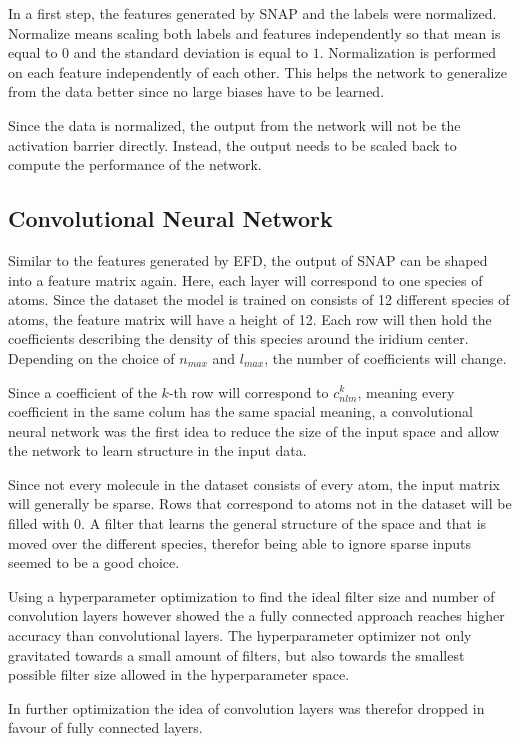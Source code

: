 In a first step, the features generated by SNAP and the labels were normalized.
Normalize means scaling both labels and features independently so that mean is equal to $0$ and the standard deviation is equal to $1$.
Normalization is performed on each feature independently of each other.
This helps the network to generalize from the data better since no large biases have to be learned.

Since the data is normalized, the output from the network will not be the activation barrier directly.
Instead, the output needs to be scaled back to compute the performance of the network.

\subsection{Convolutional Neural Network}

Similar to the features generated by EFD, the output of SNAP can be shaped into a feature matrix again.
Here, each layer will correspond to one species of atoms.
Since the dataset the model is trained on consists of 12 different species of atoms, the feature matrix will have a height of 12.
Each row will then hold the coefficients describing the density of this species around the iridium center.
Depending on the choice of $n_{max}$ and $l_{max}$, the number of coefficients will change.

Since a coefficient of the $k$-th row will correspond to $c^k_{nlm}$, meaning every coefficient in the same colum has the same spacial meaning,
a convolutional neural network was the first idea to reduce the size of the input space and allow the network to learn structure in the input data.

Since not every molecule in the dataset consists of every atom, the input matrix will generally be sparse.
Rows that correspond to atoms not in the dataset will be filled with 0.
A filter that learns the general structure of the space and that is moved over the different species, therefor 
being able to ignore sparse inputs seemed to be a good choice.

Using a hyperparameter optimization to find the ideal filter size and number of convolution layers however showed
the a fully connected approach reaches higher accuracy than convolutional layers.
The hyperparameter optimizer not only gravitated towards a small amount of filters, but also towards 
the smallest possible filter size allowed in the hyperparameter space.

In further optimization the idea of convolution layers was therefor dropped in favour of fully connected layers.

